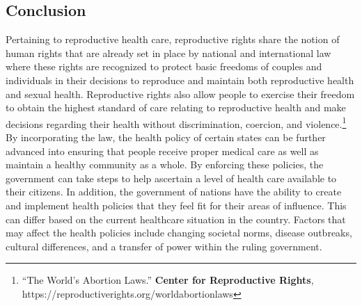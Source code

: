 \documentclass[10pt, letterpaper]{article}
\begin{document}
\subsection{Conclusion}

Pertaining to reproductive health care, reproductive rights share the
notion of human rights that are already set in place by national and
international law where these rights are recognized to protect basic
freedoms of couples and individuals in their decisions to reproduce and
maintain both reproductive health and sexual health. Reproductive rights
also allow people to exercise their freedom to obtain the highest
standard of care relating to reproductive health and make decisions
regarding their health without discrimination, coercion, and
violence.\footnote{``The World's Abortion Laws.'' \textbf{Center for
  Reproductive Rights}, https://reproductiverights.org/worldabortionlaws} \\

By incorporating the law, the health policy of certain states can be
further advanced into ensuring that people receive proper medical care
as well as maintain a healthy community as a whole. By enforcing these
policies, the government can take steps to help ascertain a level of
health care available to their citizens. In addition, the government of
nations have the ability to create and implement health policies that
they feel fit for their areas of influence. This can differ based on the
current healthcare situation in the country. Factors that may affect the
health policies include changing societal norms, disease outbreaks,
cultural differences, and a transfer of power within the ruling
government. \\
\end{document}
